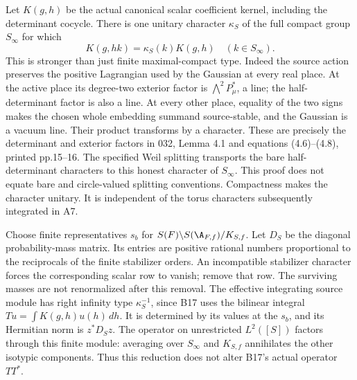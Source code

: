 \documentclass[11pt]{article}
\theoremstyle{definition}\newtheorem{definition}[theorem]{Definition}\newtheorem{remark}[theorem]{Remark}
\begin{document}
Let $K(g,h)$ be the actual canonical scalar coefficient
kernel, including the determinant cocycle.  There is one
unitary character $\kappa_S$ of the full compact group
$S_\infty$ for which
\[
                 K(g,hk)=\kappa_S(k)K(g,h)
                    \quad(k\in S_\infty).
 \tag{B24a}
\]
This is stronger than just finite maximal-compact type.
Indeed the source action preserves the positive
Lagrangian used by the Gaussian at every real place.
At the active place its degree-two exterior factor is
$\bigwedge^2P_\mu^*$, a line; the half-determinant
factor is also a line.  At every other place, equality
of the two signs makes the chosen whole embedding
summand source-stable, and the Gaussian is a vacuum
line.  Their product transforms by a character.
These are precisely the determinant and exterior
factors in 032, Lemma 4.1 and equations (4.6)--(4.8),
printed pp.15--16.
The specified Weil splitting transports the bare
half-determinant characters to this honest character
of $S_\infty$.  This proof does not equate bare and
circle-valued splitting conventions.  Compactness
makes the character unitary.  It is independent of
the torus characters subsequently integrated in A7.

Choose finite representatives $s_b$ for
$S(F)\backslash S(\A_{F,f})/K_{S,f}$.  Let $D_S$ be
the diagonal probability-mass matrix.  Its entries
are positive rational numbers proportional to the
reciprocals of the finite stabilizer orders.
An incompatible stabilizer character forces the
corresponding scalar row to vanish; remove that row.
The surviving masses are not renormalized after
this removal.
The effective integrating source module has right
infinity type $\kappa_S^{-1}$, since B17 uses the
bilinear integral $Tu=\int K(g,h)u(h)\,dh$.
It is determined by its values at the $s_b$, and
its Hermitian norm is $z^*D_Sz$.
The operator on unrestricted $L^2([S])$ factors
through this finite module: averaging over
$S_\infty$ and $K_{S,f}$ annihilates the other
isotypic components.  Thus this reduction does not
alter B17's actual operator $TT^*$.
\end{document}

